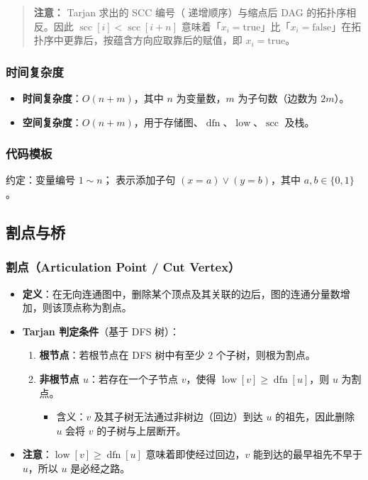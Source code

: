 \begin{quote}
\textbf{注意：} Tarjan 求出的 SCC 编号（ 递增顺序）与缩点后 DAG 的拓扑序相反。因此 $\operatorname{scc}[i] < \operatorname{scc}[i + n]$ 意味着「$x_i = \text{true}$」比「$x_i = \text{false}$」在拓扑序中更靠后，按蕴含方向应取靠后的赋值，即 $x_i = \text{true}$。
\end{quote}

\subsubsection{时间复杂度}

\begin{itemize}
  \item \textbf{时间复杂度}：$O(n + m)$，其中 $n$ 为变量数，$m$ 为子句数（边数为 $2m$）。
  \item \textbf{空间复杂度}：$O(n + m)$，用于存储图、$\operatorname{dfn}$、$\operatorname{low}$、$\operatorname{scc}$ 及栈。
\end{itemize}

\subsubsection{代码模板}

约定：变量编号 $1 \sim n$； 表示添加子句 $(x = a) \lor (y = b)$，其中 $a, b \in \{0, 1\}$。



\subsection{割点与桥}

\subsubsection{割点（Articulation Point / Cut Vertex）}

\begin{itemize}
  \item \textbf{定义}：在无向连通图中，删除某个顶点及其关联的边后，图的连通分量数增加，则该顶点称为割点。
  \item \textbf{Tarjan 判定条件}（基于 DFS 树）：
    \begin{enumerate}
      \item \textbf{根节点}：若根节点在 DFS 树中有至少 $2$ 个子树，则根为割点。
      \item \textbf{非根节点 $u$}：若存在一个子节点 $v$，使得 $\operatorname{low}[v] \ge \operatorname{dfn}[u]$，则 $u$ 为割点。
        \begin{itemize}
          \item 含义：$v$ 及其子树无法通过非树边（回边）到达 $u$ 的祖先，因此删除 $u$ 会将 $v$ 的子树与上层断开。
        \end{itemize}
    \end{enumerate}
  \item \textbf{注意}：$\operatorname{low}[v] \ge \operatorname{dfn}[u]$ 意味着即使经过回边，$v$ 能到达的最早祖先不早于 $u$，所以 $u$ 是必经之路。
\end{itemize}

